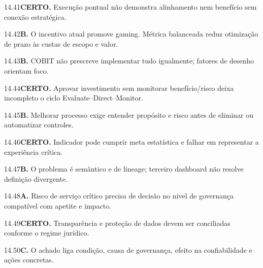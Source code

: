 \begin{solucao}{14.41}\textbf{CERTO.} Execução pontual não demonstra alinhamento nem benefício sem conexão estratégica.\end{solucao}
\begin{solucao}{14.42}\textbf{B.} O incentivo atual promove gaming. Métrica balanceada reduz otimização de prazo às custas de escopo e valor.\end{solucao}
\begin{solucao}{14.43}\textbf{B.} COBIT não prescreve implementar tudo igualmente; fatores de desenho orientam foco.\end{solucao}
\begin{solucao}{14.44}\textbf{CERTO.} Aprovar investimento sem monitorar benefício/risco deixa incompleto o ciclo Evaluate--Direct--Monitor.\end{solucao}
\begin{solucao}{14.45}\textbf{B.} Melhorar processo exige entender propósito e risco antes de eliminar ou automatizar controles.\end{solucao}
\begin{solucao}{14.46}\textbf{CERTO.} Indicador pode cumprir meta estatística e falhar em representar a experiência crítica.\end{solucao}
\begin{solucao}{14.47}\textbf{B.} O problema é semântico e de lineage; terceiro dashboard não resolve definição divergente.\end{solucao}
\begin{solucao}{14.48}\textbf{A.} Risco de serviço crítico precisa de decisão no nível de governança compatível com apetite e impacto.\end{solucao}
\begin{solucao}{14.49}\textbf{CERTO.} Transparência e proteção de dados devem ser conciliadas conforme o regime jurídico.\end{solucao}
\begin{solucao}{14.50}\textbf{C.} O achado liga condição, causa de governança, efeito na confiabilidade e ações concretas.\end{solucao}
